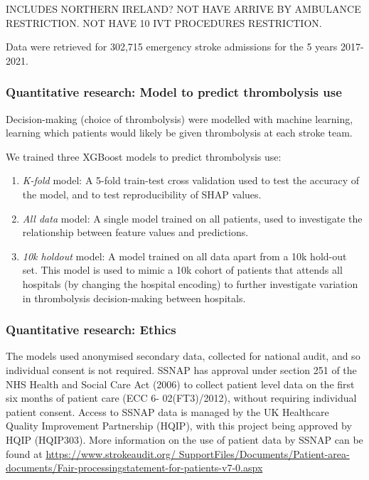 INCLUDES NORTHERN IRELAND? NOT HAVE ARRIVE BY AMBULANCE RESTRICTION. NOT HAVE 10 IVT PROCEDURES RESTRICTION.

Data were retrieved for 302,715 emergency stroke admissions for the 5 years 2017-2021.

\subsubsection{Quantitative research: Model to predict thrombolysis use}

Decision-making (choice of thrombolysis) were modelled with machine learning, learning which patients would likely be given thrombolysis at each stroke team.

We trained three XGBoost models to predict thrombolysis use:
\begin{enumerate}
    \item \emph{K-fold} model: A 5-fold train-test cross validation used to test the accuracy of the model, and to test reproducibility of SHAP values.
       
    \item \emph{All data} model: A single model trained on all patients, used to investigate the relationship between feature values and predictions.
    
    \item \emph{10k holdout} model: A model trained on all data apart from a 10k hold-out set. This model is used to mimic a 10k cohort of patients that attends all hospitals (by changing the hospital encoding) to further investigate variation in thrombolysis decision-making between hospitals.
\end{enumerate}





\subsubsection{Quantitative research: Ethics}

The models used anonymised secondary data, collected for national audit, and so individual consent is not required. SSNAP has approval under section 251 of the NHS Health and Social Care Act (2006) to collect patient level data on the first six months of patient care (ECC 6- 02(FT3)/2012), without requiring individual patient consent. Access to SSNAP data is managed by the UK Healthcare Quality Improvement Partnership (HQIP), with this project being approved by HQIP (HQIP303). More information on the use of patient data by SSNAP can be found at \url{https://www.strokeaudit.org/ SupportFiles/Documents/Patient-area-documents/Fair-processingstatement-for-patients-v7-0.aspx}


